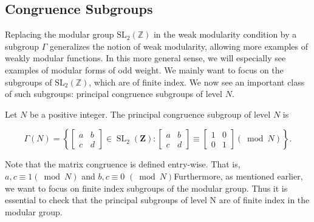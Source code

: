 \subsection{Congruence Subgroups}
Replacing the modular group $\mathrm{SL}_{2}(\mathbb{Z})$ in the weak modularity condition by a subgroup $\Gamma$ generalizes the notion of weak modularity, allowing more examples of weakly modular functions. In this more general sense, we will especially see examples of modular forms of odd weight. We mainly want to focus on the subgroups of $\mathrm{SL}_{2}(\mathbb{Z})$, which are of finite index. We now see an important class of such subgroups: principal congruence subgroups of level $N$. 
\begin{definition}
    Let $N$ be a positive integer. The principal congruence subgroup of level $N$ is

$$
\Gamma(N)=\left\{\left[\begin{array}{ll}
a & b \\
c & d
\end{array}\right] \in \operatorname{SL}_{2}(\mathbf{Z}):\left[\begin{array}{ll}
a & b \\
c & d
\end{array}\right] \equiv\left[\begin{array}{ll}
1 & 0 \\
0 & 1
\end{array}\right](\bmod N)\right\} .
$$
\end{definition}
\vspace{2.5}
Note that the matrix congruence is defined entry-wise. That is, $a, c \equiv 1(\bmod N)$ and $b, c \equiv 0$ $(\bmod N)$Furthermore, as mentioned earlier, we want to focus on finite index subgroups of the modular group. Thus it is essential to check that the principal subgroups of level N are of finite index in the modular group. 

